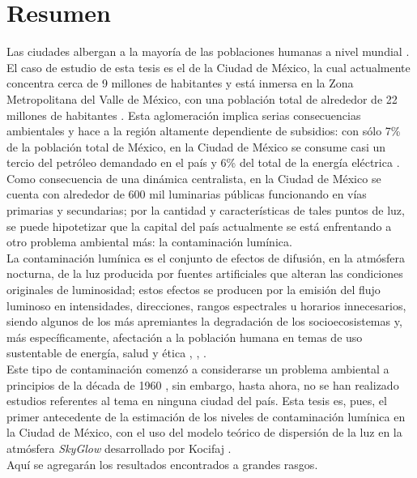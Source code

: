 \chapter{Resumen}

Las ciudades albergan a la mayoría de las poblaciones humanas a nivel mundial \citep{Zari2018}. El caso de estudio de esta tesis es el de la Ciudad de México, la cual actualmente concentra cerca de 9 millones de habitantes \citep{INEGI2015} y está inmersa en la Zona Metropolitana del Valle de México, con una población total de alrededor de 22 millones de habitantes \citep{OCDE2015}. Esta aglomeración implica serias consecuencias ambientales y hace a la región altamente dependiente de subsidios: con sólo 7\% de la población total de México, en la Ciudad de México se consume casi un tercio del petróleo demandado en el país y 6\% del total de la energía eléctrica \citep{SENER2013}.\\

Como consecuencia de una dinámica centralista, en la Ciudad de México se cuenta con alrededor de 600 mil luminarias públicas funcionando en vías primarias y secundarias; por la cantidad y características de tales puntos de luz, se puede hipotetizar que la capital del país actualmente se está enfrentando a otro problema ambiental más: la contaminación lumínica.\\

La contaminación lumínica es el conjunto de efectos de difusión, en la atmósfera nocturna, de la luz producida por fuentes artificiales que alteran las condiciones originales de luminosidad; estos efectos se producen por la emisión del flujo luminoso en intensidades, direcciones, rangos espectrales u horarios innecesarios, siendo algunos de los más apremiantes la degradación de los socioecosistemas y, más específicamente, afectación a la población humana en temas de uso sustentable de energía, salud y ética \citep{AtlasREPSA}, \citep{LibroCL}, \citep{Stone2017}.\\

Este tipo de contaminación comenzó a considerarse un problema ambiental a principios de la década de 1960 \citep{LibroCL}, sin embargo, hasta ahora, no se han realizado estudios referentes al tema en ninguna ciudad del país. Esta tesis es, pues, el primer antecedente de la estimación de los niveles de contaminación lumínica en la Ciudad de México, con el uso del modelo teórico de dispersión de la luz en la atmósfera \textit{SkyGlow} desarrollado por Kocifaj \citep{Kocifaj2007}.\\

Aquí se agregarán los resultados encontrados a grandes rasgos.

